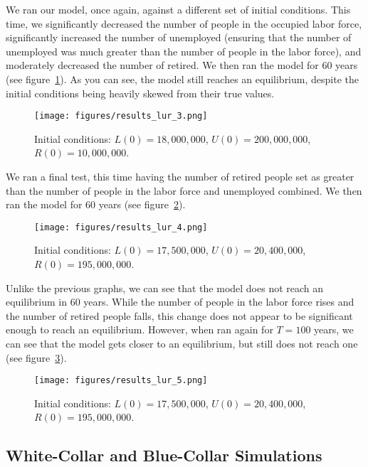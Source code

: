 \documentclass[11pt]{amsart}
\begin{document}
We ran our model, once again, against a different set of initial conditions. This time, we significantly decreased the number of people in the occupied
labor force, significantly increased the number of unemployed (ensuring that the number of unemployed was much greater than the number of people in the labor force), and moderately decreased the number of retired. We then ran the model for 60 years (see figure~\ref{fig:results_lur_3}).
As you can see, the model still reaches an equilibrium, despite the initial conditions being heavily skewed from their true values.

\begin{figure}[h]
    \centering
    \texttt{[image: figures/results\_lur\_3.png]}
    \caption{Initial conditions: $L(0) = 18,000,000$, $U(0) = 200,000,000$, $R(0) = 10,000,000$.}
    \label{fig:results_lur_3}
\end{figure}

We ran a final test, this time having the number of retired people set as greater than the number of
people in the labor force and unemployed combined. We then ran the model for 60 years (see figure~\ref{fig:results_lur_4}).

\begin{figure}[h]
    \centering
    \texttt{[image: figures/results\_lur\_4.png]}
    \caption{Initial conditions: $L(0) = 17,500,000$, $U(0) = 20,400,000$, $R(0) = 195,000,000$.}
    \label{fig:results_lur_4}
\end{figure}

Unlike the previous graphs, we can see that the model does not reach an equilibrium in 60 years. 
While the number of people in the labor force rises and the number of retired people falls, 
this change does not appear to be significant enough to reach an equilibrium. However,
when ran again for $T = 100$ years, we can see that the model gets closer to an equilibrium, but 
still does not reach one (see figure~\ref{fig:results_lur_5}).

\begin{figure}[h]
    \centering
    \texttt{[image: figures/results\_lur\_5.png]}
    \caption{Initial conditions: $L(0) = 17,500,000$, $U(0) = 20,400,000$, $R(0) = 195,000,000$.}
    \label{fig:results_lur_5}
\end{figure}

\subsection{White-Collar and Blue-Collar Simulations}
\end{document}
